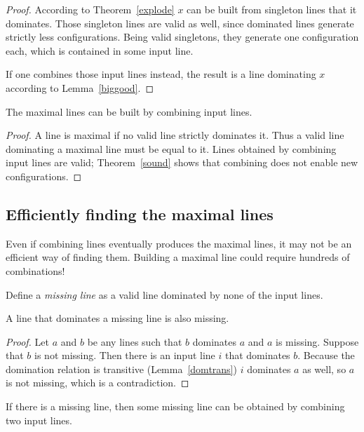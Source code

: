 \documentclass[english, 12pt, a4paper, sci, a-1b, online]{aaltothesis}
\begin{document}
\begin{proof}
According to Theorem~\ref{explode} $x$ can be built from singleton lines that it dominates. Those singleton lines are valid as well, since dominated lines generate strictly less configurations. Being valid singletons, they generate one configuration each, which is contained in some input line.

If one combines those input lines instead, the result is a line dominating $x$ according to Lemma~\ref{biggood}.
\end{proof}

\begin{corollary}
The maximal lines can be built by combining input lines.
\end{corollary}

\begin{proof}
A line is maximal if no valid line strictly dominates it. Thus a valid line dominating a maximal line must be equal to it. Lines obtained by combining input lines are valid; Theorem~\ref{sound} shows that combining does not enable new configurations.
\end{proof}

\subsection{Efficiently finding the maximal lines}

Even if combining lines eventually produces the maximal lines, it may not be an efficient way of finding them. Building a maximal line could require hundreds of combinations!

Define a \emph{missing line} as a valid line dominated by none of the input lines.

\begin{lemma}\label{biggermissing}
A line that dominates a missing line is also missing.
\end{lemma}

\begin{proof}
Let $a$ and $b$ be any lines such that $b$ dominates $a$ and $a$ is missing. Suppose that $b$ is not missing. Then there is an input line $i$ that dominates $b$. Because the domination relation is transitive (Lemma~\ref{domtrans}) $i$ dominates $a$ as well, so $a$ is not missing, which is a contradiction.
\end{proof}

\begin{theorem}\label{justtwo}
If there is a missing line, then some missing line can be obtained by combining two input lines.
\end{theorem}
\end{document}
